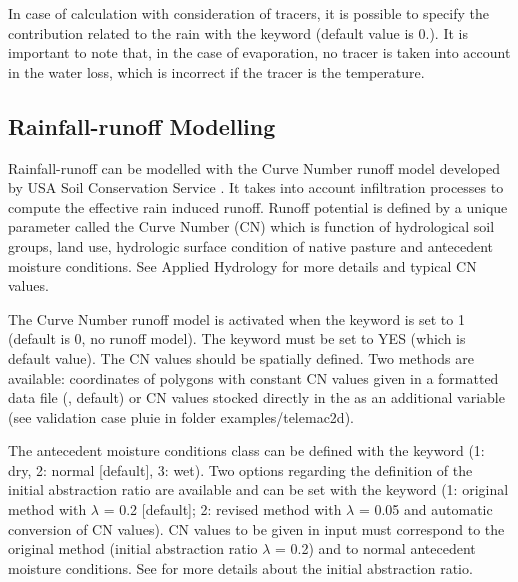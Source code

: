 In case of calculation with consideration of tracers, it is possible to specify
the contribution related to the rain with the keyword
 (default value is 0.).
It is important to note that, in the case of evaporation, no tracer is taken
into account in the water loss, which is incorrect if the tracer is the
temperature.

\subsection{Rainfall-runoff Modelling}

Rainfall-runoff can be modelled with the Curve Number runoff model developed
by USA Soil Conservation Service \cite{soil1972national}. It takes into 
account infiltration processes to compute the effective rain induced runoff.
Runoff potential is defined by a unique parameter called the Curve Number (CN)
which is function of hydrological soil groups, land use, hydrologic surface
condition of native pasture and antecedent moisture conditions.
See Applied Hydrology \citep{chow1988mays} 
for more details and typical CN values. 

The Curve Number runoff model is activated when the keyword
 is set to 1 (default is 0, no runoff model).
The keyword  must be set to YES (which is default value).
The CN values should be spatially defined.
Two methods are available: coordinates of polygons with constant CN values
given in a formatted data file (, default)
or CN values stocked directly in the  as
an additional variable (see validation case pluie in folder examples/telemac2d).

The antecedent moisture conditions class can be defined with the keyword
 (1: dry, 2: normal [default], 3: wet).
Two options regarding the definition of the initial abstraction ratio are
available
and can be set with the keyword 
(1: original method with $\lambda$ = 0.2 [default];
 2: revised method with $\lambda$ = 0.05 and automatic conversion of CN values).
CN values to be given in input must correspond to the original method
(initial abstraction ratio $\lambda$ = 0.2) and to normal antecedent moisture
conditions. See \cite{woodward2003runoff} for more details about the initial
abstraction ratio.

